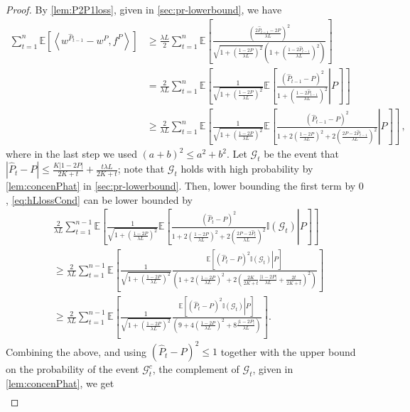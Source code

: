 \documentclass[english]{article}
\newcommand{\cG}{\mathcal{G}}
\newcommand{\hP}{\hat{P}}
\newcommand{\Exp}[1]{\mathbb{E}\left[ #1 \right]}
\newcommand{\Expc}[2]{\mathbb{E}\left[ \left. #1 \right| #2 \right]}
\newcommand{\ind}{\mathbb{I}}
\newcommand{\inner}[1]{\left\langle#1\right\rangle}
\begin{document}
\begin{proof}
	By \cref{lem:P2P1loss}, given in \cref{sec:pr-lowerbound}, we have
	\begin{align}
	\sum_{t=1}^n \Exp{\inner{w^{\hP_{t-1}} - w^P, f^P}} 
	& \ge \frac{\lambda L}{2}\sum_{t=1}^n \Exp{ \frac{\left( \frac{2\hP_{t-1} - 2P}{\lambda L} \right)^2}{\sqrt{1+\left( \frac{1-2P}{\lambda L}\right)^2 } \left(1+\left( \frac{1-2\hP_{t-1}}{\lambda L}\right)^2 \right)} } \label{eq:hLloss} \\
	& = \frac{2}{\lambda L}\sum_{t=1}^n \Exp{\frac{1}{\sqrt{1+\left( \frac{1-2P}{\lambda L}\right)^2 }}\Expc{ \frac{ ( \hP_{t-1} - P)^2}{ 1+\left( \frac{1-2\hat P_{t-1}}{\lambda L}\right)^2 } }{P} } \nonumber \\
	& \ge \frac{2}{\lambda L}\sum_{t=1}^n \Exp{ \frac{1}{\sqrt{1+\left( \frac{1-2P}{\lambda L}\right)^2 }}\Expc{ \frac{( \hP_{t-1} - P)^2}{ 1+ 2\left( \frac{1-2P}{\lambda L}\right)^2 +2 \left(\frac{2P - 2\hP_{t-1}}{\lambda L}\right)^2 }}{P } } \label{eq:hLlossCond}\,,
	\end{align}
	where in the last step we used $(a+b)^2 \le a^2 + b^2$. 	
	Let $\cG_t$ be the event that $|\hat P_{t} - P| \le \frac{K |1-2P|}{2K+t} + \frac{t \lambda L}{2K+t}$; note that $\cG_t$ holds with high probability by \cref{lem:concenPhat} in \cref{sec:pr-lowerbound}. Then, lower bounding the first term by $0$, \eqref{eq:hLlossCond} can be lower bounded by 
	\begin{align*}
	&\frac{2}{\lambda L}\sum_{t=1}^{n-1} \Exp{ \frac{1}{\sqrt{1+\left( \frac{1-2P}{\lambda L}\right)^2 }}\Expc{ \frac{( \hP_{t} - P)^2}{ 1+ 2\left( \frac{1-2P}{\lambda L}\right)^2 +2 \left(\frac{2P - 2\hP_{t}}{\lambda L}\right)^2 }\ind(\cG_t)}{P } } \\
	&\ge \frac{2}{\lambda L}\sum_{t=1}^{n-1} \Exp{ \frac{1}{\sqrt{1+\left( \frac{1-2P}{\lambda L}\right)^2 }}\frac{\Expc{ ( \hP_{t} - P )^2\ind(\cG_t) }{P}}{ \left(1+ 2\left( \frac{1-2P}{\lambda L}\right)^2 +2 \left(\frac{2K}{2K+t}\frac{|1-2P|}{\lambda L} + \frac{2t}{2K+t}\right)^2 \right)}  } \\
	& \ge \frac{2}{\lambda L}\sum_{t=1}^{n-1} \Exp{\frac{1}{\sqrt{1+\left( \frac{1-2P}{\lambda L}\right)^2 }}\frac{\Expc{ ( \hP_{t} - P )^2\ind(\cG_t) }{P}}{ \left(9+ 4\left( \frac{1-2P}{\lambda L}\right)^2 +8 \frac{|1-2P|}{\lambda L} \right)}  }.
	\end{align*}
	Combining the above, and using $(\hP_{t} - P )^2 \le 1$ together with the upper bound on the probability of the event $\cG^c_t$, the complement of $\cG_t$, given in \cref{lem:concenPhat}, we get
	\begin{align}

\end{align}
\end{proof}
\end{document}
